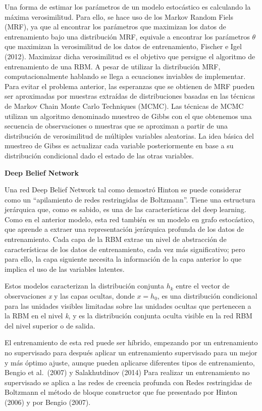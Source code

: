 \documentclass[
  a4paper,
  DIV=11,
  numbers=noendperiod]{scrreprt}
\begin{document}
Una forma de estimar los parámetros de un modelo estocástico es
calculando la máxima verosimilitud. Para ello, se hace uso de los Markov
Random Fiels (MRF), ya que al encontrar los parámetros que maximizan los
datos de entrenamiento bajo una distribución MRF, equivale a encontrar
los parámetros \(\theta\) que maximizan la verosimilitud de los datos de
entrenamiento, Fischer e Igel (2012). Maximizar dicha verosimilitud es
el objetivo que persigue el algoritmo de entrenamiento de una RBM. A
pesar de utilizar la distribución MRF, computacionalmente hablando se
llega a ecuaciones inviables de implementar. Para evitar el problema
anterior, las esperanzas que se obtienen de MRF pueden ser aproximadas
por muestras extraídas de distribuciones basadas en las técnicas de
Markov Chain Monte Carlo Techniques (MCMC). Las técnicas de MCMC
utilizan un algoritmo denominado muestreo de Gibbs con el que obtenemos
una secuencia de observaciones o muestras que se aproximan a partir de
una distribución de verosimilitud de múltiples variables aleatorias. La
idea básica del muestreo de Gibss es actualizar cada variable
posteriormente en base a su distribución condicional dado el estado de
las otras variables.

\textbf{Deep Belief Network}

Una red Deep Belief Network tal como demostró Hinton se puede considerar
como un ``apilamiento de redes restringidas de Boltzmann''. Tiene una
estructura jerárquica que, como es sabido, es una de las características
del deep learning. Como en el anterior modelo, esta red también es un
modelo en grafo estocástico, que aprende a extraer una representación
jerárquica profunda de los datos de entrenamiento. Cada capa de la RBM
extrae un nivel de abstracción de características de los datos de
entrenamiento, cada vez más significativo; pero para ello, la capa
siguiente necesita la información de la capa anterior lo que implica el
uso de las variables latentes.

Estos modelos caracterizan la distribución conjunta \(h_k\) entre el
vector de observaciones \emph{x} y las capas ocultas, donde \(x=h_0\),
es una distribución condicional para las unidades visibles limitadas
sobre las unidades ocultas que pertenecen a la RBM en el nivel \emph{k},
y es la distribución conjunta oculta visible en la red RBM del nivel
superior o de salida.

El entrenamiento de esta red puede ser híbrido, empezando por un
entrenamiento no supervisado para después aplicar un entrenamiento
supervisado para un mejor y más óptimo ajuste, aunque pueden aplicarse
diferentes tipos de entrenamiento, Bengio et al.~(2007) y Salakhutdinov
(2014) Para realizar un entrenamiento no supervisado se aplica a las
redes de creencia profunda con Redes restringidas de Boltzmann el método
de bloque constructor que fue presentado por Hinton (2006) y por Bengio
(2007).
\end{document}
